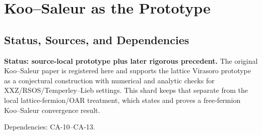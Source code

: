 
\section{Koo--Saleur as the Prototype}
\label{sec:koo-saleur-prototype}

\subsection{Status, Sources, and Dependencies}

\textbf{Status: source-local prototype plus later rigorous precedent.}  The
original Koo--Saleur paper is registered here and supports the lattice Virasoro
prototype as a conjectural construction with numerical and analytic checks for
XXZ/RSOS/Temperley--Lieb settings.  This shard keeps that separate from the
local lattice-fermion/OAR treatment, which states and proves a free-fermion
Koo--Saleur convergence result.

Dependencies: CA-10--CA-13.

